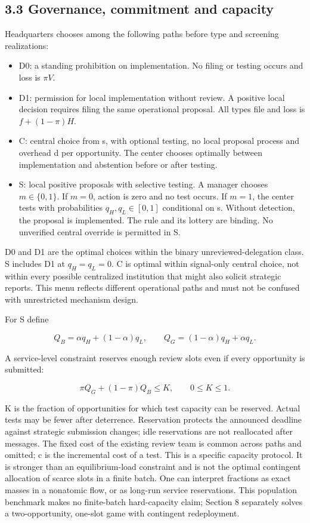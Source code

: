 \documentclass[
  11pt,
]{article}
\providecommand{\tightlist}{%
  \setlength{\itemsep}{0pt}\setlength{\parskip}{0pt}}
\begin{document}
\subsection{3.3 Governance, commitment and
capacity}\label{governance-commitment-and-capacity}

Headquarters chooses among the following paths before type and screening
realizations:

\begin{itemize}
\tightlist
\item
  D0: a standing prohibition on implementation. No filing or testing
  occurs and loss is \(\pi V\).
\item
  D1: permission for local implementation without review. A positive
  local decision requires filing the same operational proposal. All
  types file and loss is \(f+(1-\pi)H\).
\item
  C: central choice from s, with optional testing, no local proposal
  process and overhead d per opportunity. The center chooses optimally
  between implementation and abstention before or after testing.
\item
  S: local positive proposals with selective testing. A manager chooses
  \(m\in\{0,1\}\). If \(m=0\), action is zero and no test occurs. If
  \(m=1\), the center tests with probabilities \(q_H,q_L\in[0,1]\)
  conditional on s. Without detection, the proposal is implemented. The
  rule and its lottery are binding. No unverified central override is
  permitted in S.
\end{itemize}

D0 and D1 are the optimal choices within the binary
unreviewed-delegation class. S includes D1 at \(q_H=q_L=0\). C is
optimal within signal-only central choice, not within every possible
centralized institution that might also solicit strategic reports. This
menu reflects different operational paths and must not be confused with
unrestricted mechanism design.

For S define

\[Q_B=\alpha q_H+(1-\alpha)q_L,\qquad
Q_G=(1-\alpha)q_H+\alpha q_L.\]

A service-level constraint reserves enough review slots even if every
opportunity is submitted:

\[\pi Q_G+(1-\pi)Q_B\leq K,\qquad 0\leq K\leq1. \tag{1}\]

K is the fraction of opportunities for which test capacity can be
reserved. Actual tests may be fewer after deterrence. Reservation
protects the announced deadline against strategic submission changes;
idle reservations are not reallocated after messages. The fixed cost of
the existing review team is common across paths and omitted; c is the
incremental cost of a test. This is a specific capacity protocol. It is
stronger than an equilibrium-load constraint and is not the optimal
contingent allocation of scarce slots in a finite batch. One can
interpret fractions as exact masses in a nonatomic flow, or as long-run
service reservations. This population benchmark makes no finite-batch
hard-capacity claim; Section 8 separately solves a two-opportunity,
one-slot game with contingent redeployment.
\end{document}

